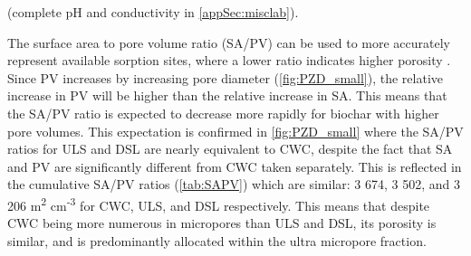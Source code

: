 (complete pH and conductivity in \cref{appSec:misclab}).


\begin{table}
\centering
\caption{Surface area (SA), pore volume (PV), elemental content (C, O, H, N) and ratios for the biochars produced for the batch tests.}
\end{table}

The surface area to pore volume ratio (SA/PV) can be used to more accurately represent available sorption sites, where a lower ratio indicates higher porosity \citep{presser2011SAPV}. Since PV increases by increasing pore diameter (\cref{fig:PZD_small}), the relative increase in PV will be higher than the relative increase in SA. This means that the SA/PV ratio is expected to decrease more rapidly for biochar with higher pore volumes. This expectation is confirmed in \cref{fig:PZD_small} where the SA/PV ratios for ULS and DSL are nearly equivalent to CWC, despite the fact that SA and PV are significantly different from CWC taken separately. This is reflected in the cumulative SA/PV ratios (\cref{tab:SAPV}) which are similar: 3 674, 3 502, and 3 206 m\textsuperscript{2} cm\textsuperscript{-3} for CWC, ULS, and DSL respectively. This means that despite CWC being more numerous in micropores than ULS and DSL, its porosity is similar, and is predominantly allocated within the ultra micropore fraction.

